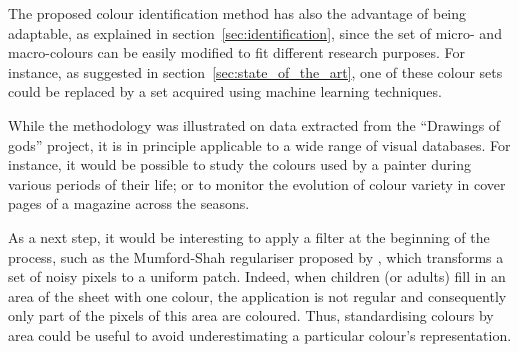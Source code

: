 \documentclass[11pt,a4paper]{article}
\begin{document}
The proposed colour identification method has also the advantage of being adaptable, as explained in section~\ref{sec:identification}, since the set of micro- and macro-colours can be easily modified to fit different research purposes. For instance, as suggested in section~\ref{sec:state_of_the_art}, one of these colour sets could be replaced by a set acquired using machine learning techniques.

While the methodology was illustrated on data extracted from the ``Drawings of gods'' project, it is in principle applicable to a wide range of visual databases. For instance, it would be possible to study the colours used by a painter during various periods of their life; or to monitor the evolution of colour variety in cover pages of a magazine across the seasons.

As a next step, it would be interesting to apply a filter at the beginning of the process, such as the Mumford-Shah regulariser proposed by \citet{erdem2009}, which transforms a set of noisy pixels to a uniform patch. Indeed, when children (or adults) fill in an area of the sheet with one colour, the application is not regular and consequently only part of the pixels of this area are coloured. Thus, standardising colours by area could be useful to avoid underestimating a particular colour's representation.




\end{document}
